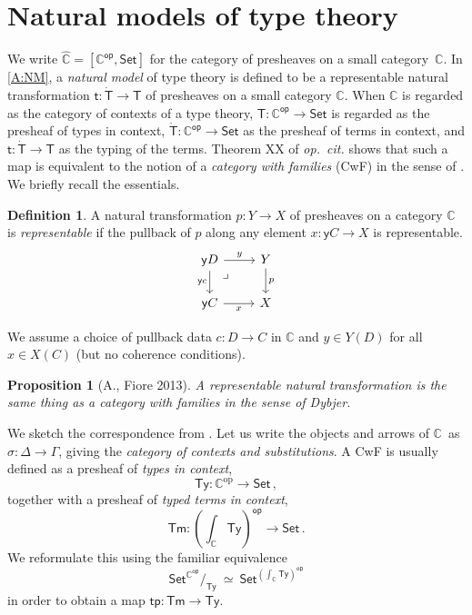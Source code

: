 \documentclass[12pt,reqno]{amsart}
\newcommand{\C}{\ensuremath{\mathbb{C}}}
\newcommand{\op}[1]{\ensuremath{{#1}^{\mathsf{op}}}}
\newcommand{\pshx}[1]{\ensuremath{\mathsf{Set}^{\op{#1}}}}
\newcommand{\psh}[1]{\ensuremath{[\op{#1},\mathsf{Set}]}}
\newcommand{\Set}{\ensuremath{\mathsf{Set}}}
\newcommand{\y}{\ensuremath{\mathsf{y}}} %
\newcommand{\tp}{\ensuremath{\mathsf{tp}}}
\newcommand{\Tm}{\ensuremath{\mathsf{Tm}}}
\newcommand{\Ty}{\ensuremath{\mathsf{Ty}}}
\renewcommand{\to}{\ensuremath{\rightarrow}}
\renewcommand{\t}{\ensuremath{\mathsf{t}}}
\newcommand{\T}{\ensuremath{\mathsf{T}}}
\newcommand{\TT}{\ensuremath{\dot{\mathsf{T}}}}
\newcommand{\pbcorner}{\arrow[dr,phantom,"\lrcorner" very near start, shift right=.5ex]} %
\newtheorem{proposition}[theorem]{Proposition}
\theoremstyle{remark}
\theoremstyle{definition}
\newtheorem{definition}[theorem]{Definition}
\begin{document}
\section{Natural models of type theory}\label{sec:NaturalModels}

\noindent We write $\widehat{\C} = \psh{\C}$ for the category of presheaves on a small category~$\C$.
%
In \eqref{A:NM}, a \emph{natural model} of type theory is defined to be a representable natural transformation $\t: \TT\to \T$ of presheaves on a small category $\C$.  When $\C$ is regarded as the category of contexts of a type theory, $\T: \op{\C} \to \Set$ is regarded as the presheaf of types in context, $\TT: \op{\C} \to \Set$ as the presheaf of terms in context, and $\t : \TT\to\T$ as the typing of the terms.   Theorem XX of \emph{op.\ cit.} shows that such a map is equivalent to the notion of a \emph{category with families} (CwF) in the sense of \cite{Dybjer}.  We briefly recall the essentials.

\begin{definition}\label{def:representablenattrans} A natural transformation $p : Y \to X$ of presheaves on a category $\C$  is \emph{representable} if the pullback of $p$ along any element $x: \y{C} \to X$ is representable.
\begin{equation*}
\begin{tikzcd}
 \y{D} \ar[d,swap,"{\y{c}}"] \ar[r,"y"] \pbcorner &  Y \ar[d, "p"]\\
\y{C} \ar[r,swap,"x"]  & X
\end{tikzcd}
\end{equation*}
\end{definition}
We assume a choice of pullback data $c : D \to C$ in $\C$ and $y \in Y(D)$ for all $x\in X(C)$ (but no coherence conditions).

\begin{proposition}[A., Fiore 2013] A representable natural transformation is the same thing as a \emph{category with families} in the sense of Dybjer.
\end{proposition}

We sketch the correspondence from \cite{Awodey:NM}.
Let us write the objects and arrows of \C\ as $\sigma : \Delta \to \Gamma$, giving the \emph{category of contexts and substitutions}.
A CwF is usually defined as a presheaf of \emph{types in context}, 
\[
\Ty : \C^{\mathrm{op}}\to \Set\,,
\]
together with a presheaf of \emph{typed terms in context}, 
\[
\Tm : {\textstyle (\int_{\C}\!\Ty)^{\mathsf{op}}\to \Set }\,.
\]
We reformulate this using the familiar equivalence
\[\textstyle
 \pshx{\C}\!/_{\Ty}\ \simeq\ \pshx{(\int_{\C}\Ty)}
\]
in order to obtain a map $\tp :\Tm \to \Ty$.
\end{document}
